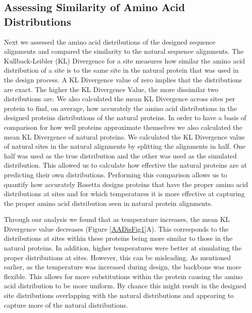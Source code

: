 \documentclass[12pt]{article}
\begin{document}
\subsection{Assessing Similarity of Amino Acid Distributions}
\label{AminoAcidDistributions}

\par Next we assessed the amino acid distributions of the designed sequence alignments and compared the similarity to the natural sequence alignments. The Kullback-Leibler (KL) Divergence for a site measures how similar the amino acid distribution of a site is to the same site in the natural protein that was used in the design process. A KL Divergence value of zero implies that the distributions are exact. The higher the KL Divergence Value, the more dissimilar two distributions are.  We also calculated the mean KL Divergence across sites per protein to find, on average, how accurately the amino acid distributions in the designed proteins distributions of the natural proteins.  In order to have a basis of comparison for how well proteins approximate themselves we also calculated the mean KL Divergence of natural proteins. We calculated the KL Divergence value of natural sites in the natural alignments by splitting the alignments in half. One half was used as the true distribution and the other was used as the simulated distribution. This allowed us to calculate how effective the natural proteins are at predicting their own distributions. Performing this comparison allows us to quantify how accurately Rosetta designs proteins that have the proper amino acid distributions at sites and for which temperatures it is more effective at capturing the proper amino acid distribution seen in natural protein alignments. 
\par Through our analysis we found that as temperature increases, the mean KL Divergence value decreases (Figure \ref{AADisFig1}A). This corresponds to the distributions at sites within these proteins being more similar to those in the natural proteins. In addition, higher temperatures were better at simulating the proper distributions  at sites. However, this can be misleading. As mentioned earlier, as the temperature was increased during design, the backbone was more flexible. This allows for more substitutions within the protein causing the amino acid distribution to be more uniform. By chance this might result in the designed site distributions overlapping with the natural distributions and appearing to capture more of the natural distributions. 
\end{document}
